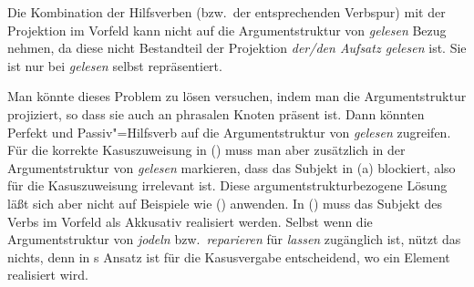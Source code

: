 Die Kombination der Hilfsverben (bzw.\ der entsprechenden Verbspur)
mit der Projektion im Vorfeld kann nicht auf die Argumentstruktur von
\emph{gelesen} Bezug nehmen, da diese nicht Bestandteil der Projektion
\emph{der/den Aufsatz gelesen} ist. Sie ist nur bei \emph{gelesen} selbst repräsentiert.

Man könnte dieses Problem zu lösen versuchen, indem man die Argumentstruktur
projiziert, so dass sie auch an phrasalen Knoten präsent ist. Dann könnten Perfekt
und Passiv"=Hilfsverb auf die Argumentstruktur von \emph{gelesen} zugreifen.
Für die korrekte Kasuszuweisung in () muss man aber zusätzlich
in der Argumentstruktur von \emph{gelesen} markieren, dass das Subjekt
in (a) blockiert, also für die Kasuszuweisung irrelevant ist.
Diese argumentstrukturbezogene Lösung läßt sich aber nicht auf Beispiele
wie () anwenden. In () muss das Subjekt des Verbs im Vorfeld
als Akkusativ realisiert werden.
\eal
\label{bsp-den-saenger-jodeln}
\zl
Selbst wenn die Argumentstruktur von \emph{jodeln} bzw.\ \emph{reparieren}
für \emph{lassen} zugänglich ist, nützt das nichts, denn in \prz{}s
Ansatz ist für die Kasusvergabe entscheidend, wo ein Element realisiert wird.

